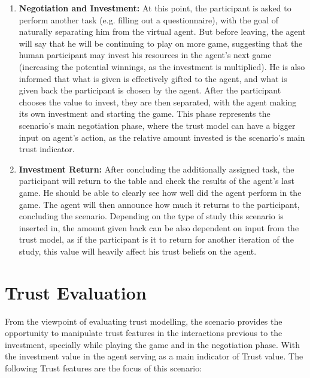 \begin{enumerate}[label=\textbf{\arabic*.}]
    \item \textbf{Negotiation and Investment:} At this point, the participant is asked to perform another task (e.g. filling out a questionnaire), with the goal of naturally separating him from the virtual agent. But before leaving, the agent will say that he will be continuing to play on more game, suggesting that the human participant may invest his resources in the agent's next game (increasing the potential winnings, as the investment is multiplied). He is also informed that what is given is effectively gifted to the agent, and what is given back the participant is chosen by the agent. After the participant chooses the value to invest, they are then separated, with the agent making its own investment and starting the game. This phase represents the scenario's main negotiation phase, where the trust model can have a bigger input on agent's action, as the relative amount invested is the scenario's main trust indicator.
    
    \item \textbf{Investment Return:} After concluding the additionally assigned task, the participant will return to the table and check the results of the agent's last game. He should be able to clearly see how well did the agent perform in the game. The agent will then announce how much it returns to the participant, concluding the scenario. Depending on the type of study this scenario is inserted in, the amount given back can be also dependent on input from the trust model, as if the participant is it to return for another iteration of the study, this value will heavily affect his trust beliefs on the agent.
\end{enumerate}

\section{Trust Evaluation}
From the viewpoint of evaluating trust modelling, the scenario provides the opportunity to manipulate trust features in the interactions previous to the investment, specially while playing the game and in the negotiation phase. With the investment value in the agent serving as a main indicator of Trust value. The following Trust features are the focus of this scenario:

